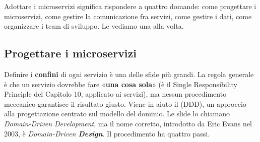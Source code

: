 Adottare i microservizi significa rispondere a quattro domande: come progettare i microservizi, come gestire la
comunicazione fra servizi, come gestire i dati, come organizzare i team di sviluppo. Le vediamo una alla volta.

\subsection{Progettare i microservizi}

Definire i \textbf{confini} di ogni servizio è una delle sfide più grandi. La regola generale è che un servizio dovrebbe
fare «\textbf{una cosa sola}» (è il Single Responsibility Principle del Capitolo 10, applicato ai servizi), ma nessun
procedimento meccanico garantisce il risultato giusto. Viene in aiuto il  (DDD), un approccio alla
progettazione centrato sul modello del dominio. Le slide lo chiamano \textit{Domain-Driven Development}, ma il nome
corretto, introdotto da Eric Evans nel 2003, è \textit{Domain-Driven \textbf{Design}}. Il procedimento ha quattro passi.

\begin{center}
\end{center}

